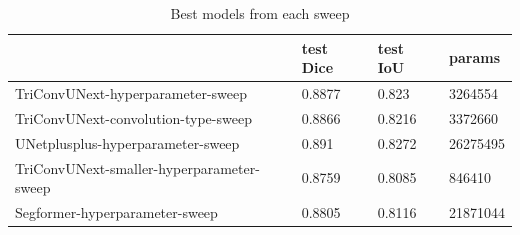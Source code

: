 \begin{table}
\caption{Best models from each sweep}
\label{tab-best_models_table}
\begin{tabular}{llll}
\toprule
 & test Dice & test IoU & params \\
\midrule
TriConvUNext-hyperparameter-sweep & 0.8877 & 0.823 & 3264554 \\
TriConvUNext-convolution-type-sweep & 0.8866 & 0.8216 & 3372660 \\
UNetplusplus-hyperparameter-sweep & 0.891 & 0.8272 & 26275495 \\
TriConvUNext-smaller-hyperparameter-sweep & 0.8759 & 0.8085 & 846410 \\
Segformer-hyperparameter-sweep & 0.8805 & 0.8116 & 21871044 \\
\bottomrule
\end{tabular}
\end{table}
